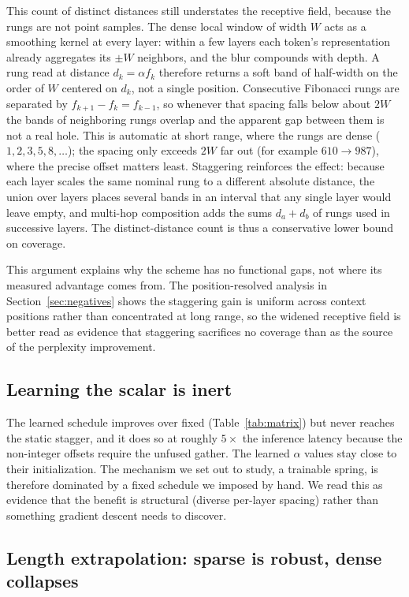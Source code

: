 \documentclass[11pt]{article}
\begin{document}
This count of distinct distances still understates the receptive field, because
the rungs are not point samples. The dense local window of width $W$ acts as a
smoothing kernel at every layer: within a few layers each token's representation
already aggregates its $\pm W$ neighbors, and the blur compounds with depth. A
rung read at distance $d_k=\alpha f_k$ therefore returns a soft band of half-width
on the order of $W$ centered on $d_k$, not a single position. Consecutive
Fibonacci rungs are separated by $f_{k+1}-f_k=f_{k-1}$, so whenever that spacing
falls below about $2W$ the bands of neighboring rungs overlap and the apparent gap
between them is not a real hole. This is automatic at short range, where the rungs
are dense ($1,2,3,5,8,\dots$); the spacing only exceeds $2W$ far out (for example
$610\to987$), where the precise offset matters least. Staggering reinforces the
effect: because each layer scales the same nominal rung to a different absolute
distance, the union over layers places several bands in an interval that any
single layer would leave empty, and multi-hop composition adds the sums
$d_a+d_b$ of rungs used in successive layers. The distinct-distance count is thus
a conservative lower bound on coverage.

This argument explains why the scheme has no functional gaps, not where its
measured advantage comes from. The position-resolved analysis in
Section~\ref{sec:negatives} shows the staggering gain is uniform across context
positions rather than concentrated at long range, so the widened receptive field
is better read as evidence that staggering sacrifices no coverage than as the
source of the perplexity improvement.

\subsection{Learning the scalar is inert}

The learned schedule improves over fixed (Table~\ref{tab:matrix}) but never
reaches the static stagger, and it does so at roughly $5\times$ the inference
latency because the non-integer offsets require the unfused gather. The learned
$\alpha$ values stay close to their initialization. The mechanism we set out to
study, a trainable spring, is therefore dominated by a fixed schedule we
imposed by hand. We read this as evidence that the benefit is structural (diverse
per-layer spacing) rather than something gradient descent needs to discover.

\subsection{Length extrapolation: sparse is robust, dense collapses}
\label{sec:extrap}
\end{document}
